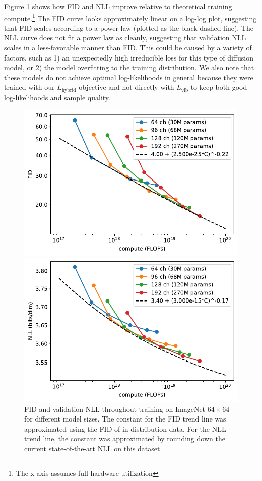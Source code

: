 \documentclass{article}
\begin{document}
Figure \ref{fig:computevsfidnll} shows how FID and NLL improve relative to theoretical training compute.\footnote{The x-axis assumes full hardware utilization} The FID curve looks approximately linear on a log-log plot, suggesting that FID scales according to a power law (plotted as the black dashed line). The NLL curve does not fit a power law as cleanly, suggesting that validation NLL scales in a less-favorable manner than FID. This could be caused by a variety of factors, such as 1) an unexpectedly high irreducible loss \citep{scalingcompendium} for this type of diffusion model, or 2) the model overfitting to the training distribution. We also note that these models do not achieve optimal log-likelihoods in general because they were trained with our $L_{\text{hybrid}}$ objective and not directly with $L_{\text{vlb}}$ to keep both good log-likelihoods and sample quality.
\begin{figure}[t]
\begin{center}
\centerline{\includegraphics[width=0.8\columnwidth]{compute_frontier-eps.pdf}}
\centerline{\includegraphics[width=0.8\columnwidth]{compute_frontier_nll-eps.pdf}}
\caption{\label{fig:computevsfidnll} FID and validation NLL throughout training on ImageNet $64 \times 64$ for different model sizes. The constant for the FID trend line was approximated using the FID of in-distribution data. For the NLL trend line, the constant was approximated by rounding down the current state-of-the-art NLL \citep{routingtransformer} on this dataset.}
\end{center}
\vskip -0.4in
\end{figure}
\end{document}
